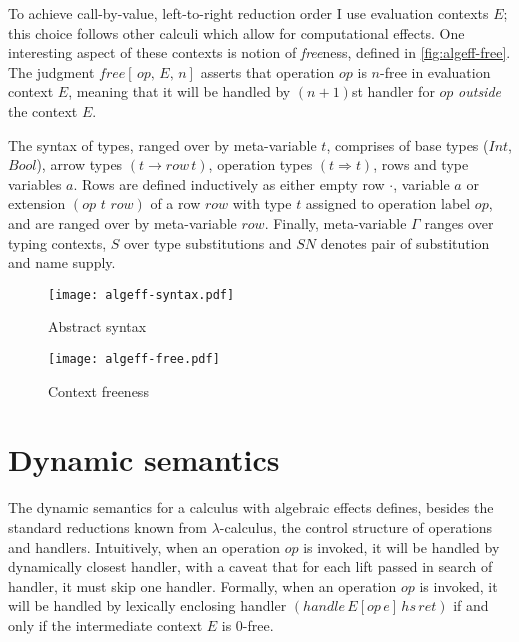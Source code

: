 \documentclass[inz, english, shortabstract]{iithesis}
\newcommand{\LC}{\(\lambda\)-calculus}
\begin{document}
To achieve call-by-value, left-to-right reduction order I use evaluation contexts $ E $; this choice follows other calculi which allow for computational effects\cite{Biernacki2017, Leijen2014, Hillerstrom2016}.
One interesting aspect of these contexts is notion of \emph{free}ness\cite{Biernacki2017}, defined in \autoref{fig:algeff-free}.
The judgment $ free[ \, op , \, E , \, n] $ asserts that operation $ op $ is $ n $-free in evaluation context $ E $, meaning that it will be handled by $(n + 1)$st handler for $ op $ \emph{outside} the context $ E $.

The syntax of types, ranged over by meta-variable $ t $, comprises of base types ($Int$, $Bool$), arrow types $(t \rightarrow row \, t)$, operation types $(t \Rightarrow t)$, rows and type variables $ a $.
Rows are defined inductively as either empty row $\cdot$, variable $ a $ or extension $(op \,\, t \,\, row)$ of a row $row$ with type $t$ assigned to operation label $op$, and are ranged over by meta-variable $row$.
Finally, meta-variable $\Gamma$ ranges over typing contexts, $S$ over type substitutions and $SN$ denotes pair of substitution and name supply.

\begin{figure}
  \centering
  \texttt{[image: algeff-syntax.pdf]}
  \caption{Abstract syntax}
  \label{fig:algeff-syntax}
\end{figure}

\begin{figure}
  \centering
  \texttt{[image: algeff-free.pdf]}
  \caption{Context freeness}
  \label{fig:algeff-free}  
\end{figure}

\section{Dynamic semantics}
The dynamic semantics for a calculus with algebraic effects defines, besides the standard reductions known from \LC{}, the control structure of operations and handlers.
Intuitively, when an operation $op$ is invoked, it will be handled by dynamically closest handler, with a caveat that for each lift passed in search of handler, it must skip one handler.
Formally, when an operation $ op $ is invoked, it will be handled by lexically enclosing handler $ (handle \, E[op \, e] \, hs \, ret) $ if and only if the intermediate context $ E $ is $0$-free\cite{Biernacki2017}.
\end{document}
